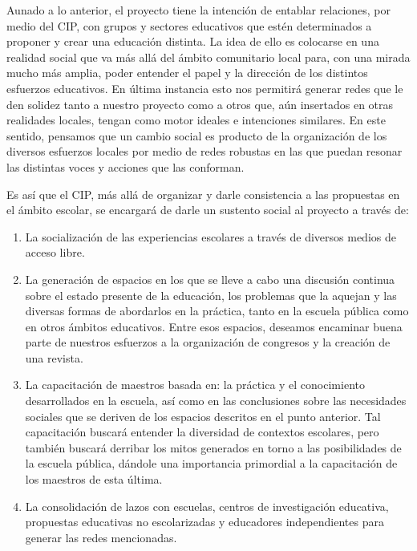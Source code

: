 \documentclass[10pt,letterpaper,oneside]{book}
\begin{document}
Aunado a lo anterior, el proyecto tiene la intención de entablar relaciones, por medio del CIP, con grupos y sectores educativos que estén determinados a proponer y crear una educación distinta. La idea de ello es colocarse en una realidad social que va más allá del ámbito comunitario local para, con una mirada mucho más amplia, poder entender el papel y la dirección de los distintos esfuerzos educativos. En última instancia esto nos permitirá generar redes que le den solidez tanto a nuestro proyecto como a otros que, aún insertados en otras realidades locales, tengan como motor ideales e intenciones similares. En este sentido, pensamos que un cambio social es producto de la organización de los diversos esfuerzos locales por medio de redes robustas en las que puedan resonar las distintas voces y acciones que las conforman.
 
Es así que el CIP, más allá de organizar y darle consistencia a las propuestas en el ámbito escolar, se encargará de darle un sustento social al proyecto a través de:

\begin{enumerate}

\item La socialización de las experiencias escolares a través de diversos medios de acceso libre.
\item La generación de espacios en los que se lleve a cabo una discusión continua sobre el estado presente de la educación, los problemas que la aquejan y las diversas formas de abordarlos en la práctica, tanto en la escuela pública como en otros ámbitos educativos. Entre esos espacios, deseamos encaminar buena parte de nuestros esfuerzos a la organización de congresos y la creación de una revista.
\item La capacitación de maestros basada en: la práctica y el conocimiento desarrollados en la escuela, así como en las conclusiones sobre las necesidades sociales que se deriven de los espacios descritos en el punto anterior. Tal capacitación buscará entender la diversidad de contextos escolares, pero también buscará derribar los mitos generados en torno a las posibilidades de la escuela pública, dándole una importancia primordial a la capacitación de los maestros de esta última.
\item La consolidación de lazos con escuelas, centros de investigación educativa, propuestas educativas no escolarizadas y educadores independientes para generar las redes mencionadas.


\end{enumerate}
\end{document}
